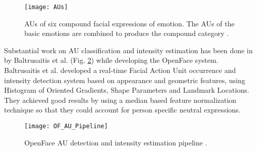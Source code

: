 \begin{figure}[H]
	\centering
	\texttt{[image: AUs]}
	\caption{AUs of six compound facial expressions of emotion. The AUs of the basic emotions are combined to produce the compound category \cite{Du2014CompoundFE}.}
	\label{fig:AUs}
\end{figure}

Substantial work on AU classification and intensity estimation has been done in \cite{Baltru2015} by Baltrusaitis et al. (Fig. \ref{fig:OF_AU_pipeline}) while developing the OpenFace \cite{Baltru2016} system. \\
Baltrusaitis et al. developed a real-time Facial Action Unit occurrence and intensity detection system based on appearance and geometric features, using Histogram of Oriented Gradients, Shape Parameters and Landmark Locations. They achieved good results by using a median based feature normalization technique so that they could account for person specific neutral expressions.\\

\begin{figure}[H]
	\centering
	\texttt{[image: OF\_AU\_Pipeline]}
	\caption{OpenFace AU detection and intensity estimation pipeline \cite{Baltru2015}.}
	\label{fig:OF_AU_pipeline}
\end{figure}

